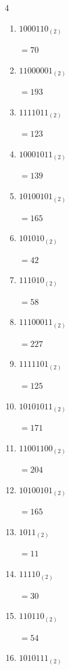 \begin{multicols}{4}
\begin{enumerate}
        $=106$

  \item $1000110_{(2)}$

        $=70$

  \item $11000001_{(2)}$

        $=193$

  \item $1111011_{(2)}$

        $=123$

  \item $10001011_{(2)}$

        $=139$

  \item $10100101_{(2)}$

        $=165$

  \item $101010_{(2)}$

        $=42$

  \item $111010_{(2)}$

        $=58$

  \item $11100011_{(2)}$

        $=227$

  \item $1111101_{(2)}$

        $=125$

\columnbreak %

\resetques

  \item $10101011_{(2)}$

        $=171$

  \item $11001100_{(2)}$

        $=204$

  \item $10100101_{(2)}$

        $=165$

  \item $1011_{(2)}$

        $=11$

  \item $11110_{(2)}$

        $=30$

  \item $110110_{(2)}$

        $=54$

  \item $1010111_{(2)}$


\end{enumerate}
\end{multicols}
